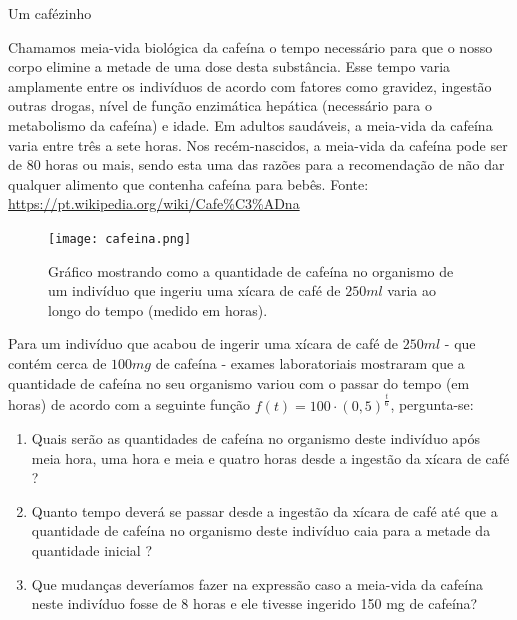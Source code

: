 \begin{task}{Um cafézinho}

Chamamos meia-vida biológica da cafeína o tempo necessário para que o nosso corpo elimine a metade de uma dose desta substância. Esse tempo varia amplamente entre os indivíduos de acordo com fatores como gravidez, ingestão outras drogas, nível de função enzimática hepática (necessário para o metabolismo da cafeína) e idade. Em adultos saudáveis, a meia-vida da cafeína varia entre três a sete horas. Nos recém-nascidos, a meia-vida da cafeína pode ser de $80$ horas ou mais, sendo esta uma das razões para a recomendação  de não dar qualquer alimento que contenha cafeína para bebês.
Fonte: \url{https://pt.wikipedia.org/wiki/Cafe\%C3\%ADna}

\begin{figure}[H]
\centering
\texttt{[image: cafeina.png]}
\caption{Gráfico mostrando como a quantidade de cafeína no organismo de um indivíduo que ingeriu uma xícara de café de $250 ml$ varia ao longo do tempo (medido em horas).}
\end{figure}

Para um indivíduo que acabou de ingerir uma xícara de café de $250 ml$ - que contém cerca de $100 mg$ de cafeína - exames laboratoriais mostraram que a quantidade de cafeína no seu organismo variou com o passar do tempo (em horas) de acordo com a seguinte função $f(t)=100 \cdot (0{,}5)^{\frac{t}{6}}$, pergunta-se:

\begin{enumerate}

\item{}
Quais serão as quantidades de cafeína no organismo deste indivíduo após meia hora, uma hora e meia e quatro horas desde a ingestão da xícara de café ?

\item{}
Quanto tempo deverá se passar desde a ingestão da xícara de café até que a quantidade de cafeína no organismo deste indivíduo caia para a metade da quantidade inicial ?

\item{}
Que mudanças deveríamos fazer na expressão caso a meia-vida da cafeína neste indivíduo fosse de $8$ horas e ele tivesse ingerido 150 mg de cafeína?

\end{enumerate}

\end{task}

